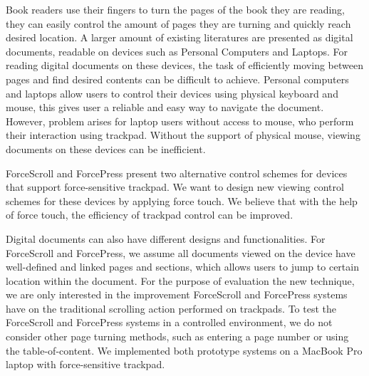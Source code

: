 \documentclass{sigchi}
\begin{document}
Book readers use their fingers to turn the pages of the book they are reading, they can easily control the amount of pages they are turning and quickly reach desired location. A larger amount of existing literatures are presented as digital documents, readable on devices such as Personal Computers and Laptops. For reading digital documents on these devices, the task of efficiently moving between pages and find desired contents can be difficult to achieve. Personal computers and laptops allow users to control their devices using physical keyboard and mouse, this gives user a reliable and easy way to navigate the document. However, problem arises for laptop users without access to mouse, who perform their interaction using trackpad. Without the support of physical mouse, viewing documents on these devices can be inefficient. 



ForceScroll and ForcePress present two alternative control schemes for devices that support force-sensitive trackpad. We want to design new viewing control schemes for these devices by applying force touch. We believe that with the help of force touch, the efficiency of trackpad control can be improved. 


Digital documents can also have different designs and functionalities. For ForceScroll and ForcePress, we assume all documents viewed on the device have well-defined and linked pages and sections, which allows users to jump to certain location within the document. For the purpose of evaluation the new technique, we are only interested in the improvement ForceScroll and ForcePress systems have on the traditional scrolling action performed on trackpads. To test the ForceScroll and ForcePress systems in a controlled environment, we do not consider other page turning methods, such as entering a page number or using the table-of-content. We implemented both prototype systems on a MacBook Pro laptop with force-sensitive trackpad.    
  
\end{document}
